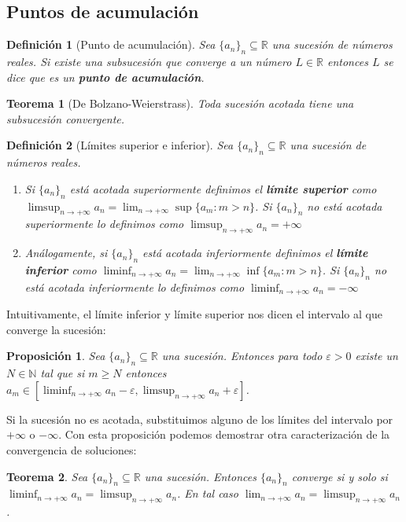 \documentclass{article}
\newtheorem{theorem}{Teorema}
\newtheorem{prop}{Proposición}
\newtheorem{define}{Definición}
\newcommand{\reales}{\mathbb{R}}
\newcommand{\naturales}{\mathbb{N}}
\newcommand{\sucesion}[1]{\{ #1 _n \}_n}
\newcommand{\sucreal}[1]{\{ #1 _n \}_n \subseteq \reales}
\newcommand{\limitesup}[1]{\limsup_{n\rightarrow +\infty} #1 _n}
\newcommand{\limiteinf}[1]{\liminf_{n\rightarrow +\infty} #1 _n}
\newcommand{\limiten}[1]{\lim_{n \rightarrow +\infty} #1}
\begin{document}
\subsection{Puntos de acumulación}
\begin{define}[Punto de acumulación]
	Sea $\sucreal{a}$ una sucesión de números reales. Si existe una subsucesión que converge a un número $L \in \reales$ entonces $L$ se dice que es un \textbf{punto de acumulación}.
\end{define}

\begin{theorem}[De Bolzano-Weierstrass]
\label{thm_bolzano_weierstrass}
	Toda sucesión acotada tiene una subsucesión convergente.
\end{theorem}

\begin{define}[Límites superior e inferior]
	Sea $\sucreal{a}$ una sucesión de números reales. 
	\begin{enumerate}
	\item
	Si $\sucesion{a}$ está acotada superiormente definimos el \textbf{límite superior} como $\limitesup{a} = \lim_{n \rightarrow +\infty} \sup\{ a_m : m > n\}$. Si $\sucesion{a}$ no está acotada superiormente lo definimos como $\limsup_{n\rightarrow +\infty} a_n = +\infty$
	\item
	Análogamente, si $\sucesion{a}$ está acotada inferiormente definimos el \textbf{límite inferior} como $\limiteinf{a} = \lim_{n \rightarrow +\infty} \inf\{ a_m : m > n\}$. Si $\sucesion{a}$ no está acotada inferiormente lo definimos como $\liminf_{n\rightarrow +\infty} a_n = -\infty$
	\end{enumerate}
\end{define}

Intuitivamente, el límite inferior y límite superior nos dicen el intervalo al que converge la sucesión:

\begin{prop}
	Sea $\sucreal{a}$ una sucesión. Entonces para todo $\varepsilon > 0$ existe un $N \in \naturales$ tal que si $m \geq N$ entonces $a_m \in [\limiteinf{a}-\varepsilon, \limitesup{a}+\varepsilon]$.
\end{prop}

Si la sucesión no es acotada, substituimos alguno de los límites del intervalo por $+\infty$ o $-\infty$.
Con esta proposición podemos demostrar otra caracterización de la convergencia de soluciones:

\begin{theorem}
	Sea $\sucreal{a}$ una sucesión. Entonces $\sucesion{a}$ converge si y solo si $\limiteinf{a} = \limitesup{a}$. En tal caso $\limiten{a_n} = \limitesup{a}$.
\end{theorem}
\end{document}

